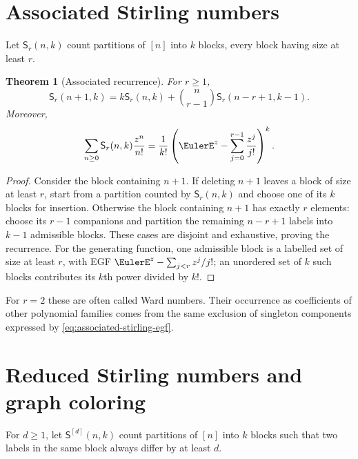 \documentclass[11pt,a4paper,oneside,openany]{book}
\newtheorem{theorem}{Theorem}[chapter]
\theoremstyle{definition}
\theoremstyle{remark}
\begin{document}
\section{Associated Stirling numbers}
Let $\mathsf S_r(n,k)$ count partitions of $[n]$ into $k$ blocks, every block having
size at least $r$.

\begin{theorem}[Associated recurrence]
\label{thm:associated-stirling-recurrence}
For $r\ge1$,
\begin{equation}
\label{eq:associated-stirling-recurrence}
 \mathsf S_r(n+1,k)
 =k\mathsf S_r(n,k)+\binom n{r-1}\mathsf S_r(n-r+1,k-1).
\end{equation}
Moreover,
\begin{equation}
\label{eq:associated-stirling-egf}
 \sum_{n\ge0}\mathsf S_r(n,k)\frac{z^n}{n!}
 =\frac1{k!}\left(\EulerE^z-\sum_{j=0}^{r-1}\frac{z^j}{j!}\right)^k.
\end{equation}
\end{theorem}
\begin{proof}
Consider the block containing $n+1$.  If deleting $n+1$ leaves a block of size at
least $r$, start from a partition counted by $\mathsf S_r(n,k)$ and choose one of
its $k$ blocks for insertion.  Otherwise the block containing $n+1$ has exactly
$r$ elements: choose its $r-1$ companions and partition the remaining $n-r+1$
labels into $k-1$ admissible blocks.  These cases are disjoint and exhaustive,
proving the recurrence.  For the generating function, one admissible block is a
labelled set of size at least $r$, with EGF
$\EulerE^z-\sum_{j<r}z^j/j!$; an unordered set of $k$ such blocks contributes its $k$th
power divided by $k!$.
\end{proof}

For $r=2$ these are often called Ward numbers.  Their occurrence as coefficients
of other polynomial families comes from the same exclusion of singleton
components expressed by \eqref{eq:associated-stirling-egf}.

\section{Reduced Stirling numbers and graph coloring}
For $d\ge1$, let $\mathsf S^{[d]}(n,k)$ count partitions of $[n]$ into $k$ blocks
such that two labels in the same block always differ by at least $d$.
\end{document}
